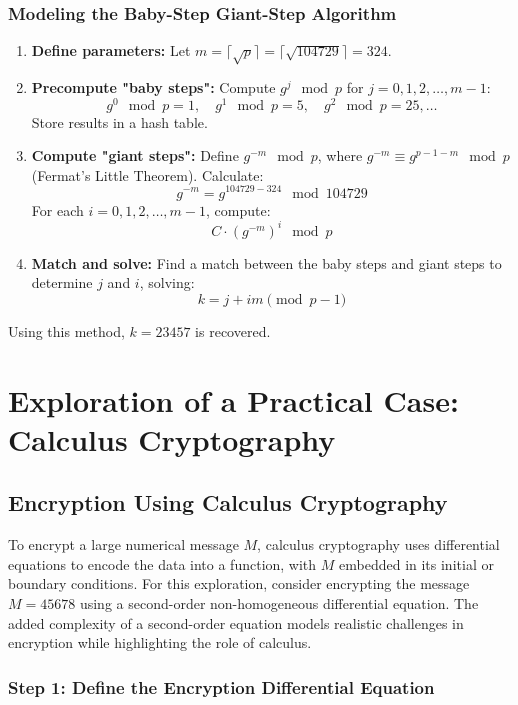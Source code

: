 \documentclass[12pt]{article}
\begin{document}
\subsubsection*{Modeling the Baby-Step Giant-Step Algorithm}
\begin{enumerate}
    \item \textbf{Define parameters:} Let \( m = \lceil \sqrt{p} \rceil = \lceil \sqrt{104729} \rceil = 324 \).

    \item \textbf{Precompute "baby steps":} Compute \( g^j \mod p \) for \( j = 0, 1, 2, \ldots, m - 1 \):
    \[
    g^0 \mod p = 1, \quad g^1 \mod p = 5, \quad g^2 \mod p = 25, \ldots
    \]
    Store results in a hash table.

    \item \textbf{Compute "giant steps":} Define \( g^{-m} \mod p \), where \( g^{-m} \equiv g^{p-1-m} \mod p \) (Fermat's Little Theorem). Calculate:
    \[
    g^{-m} = g^{104729 - 324} \mod 104729
    \]
    For each \( i = 0, 1, 2, \ldots, m - 1 \), compute:
    \[
    C \cdot (g^{-m})^i \mod p
    \]

    \item \textbf{Match and solve:} Find a match between the baby steps and giant steps to determine \( j \) and \( i \), solving:
    \[
    k = j + im \pmod{p-1}
    \]
\end{enumerate}

Using this method, \( k = 23457 \) is recovered.


\section*{Exploration of a Practical Case: Calculus Cryptography}

\subsection*{Encryption Using Calculus Cryptography}

To encrypt a large numerical message \( M \), calculus cryptography uses differential equations to encode the data into a function, with \( M \) embedded in its initial or boundary conditions. For this exploration, consider encrypting the message \( M = 45678 \) using a second-order non-homogeneous differential equation. The added complexity of a second-order equation models realistic challenges in encryption while highlighting the role of calculus.

\subsubsection*{Step 1: Define the Encryption Differential Equation}
\end{document}
